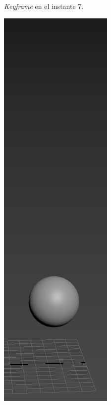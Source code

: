 \documentclass{article}
\begin{document}
\begin{figure}[H]
\begin{subfigure}[H]{0.15\textwidth}
	    \caption{\textit{Keyframe} en el instante 7.}
	\end{subfigure}
    \hfill
	\begin{subfigure}[H]{0.15\textwidth}
	    \centering
	    \includegraphics[width=\textwidth]{imagenes/Ejercicio 2/p2_11.png}

\end{subfigure}
\end{figure}
\end{document}
